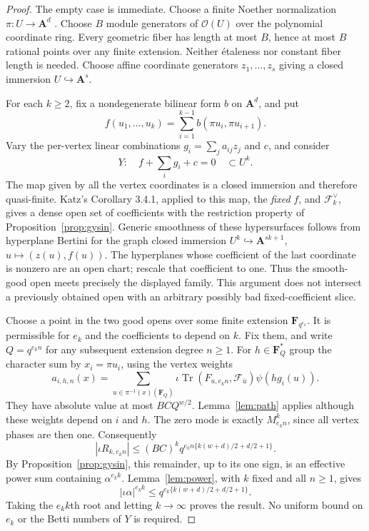 \documentclass[11pt,a4paper]{article}
\theoremstyle{remark}
\begin{document}
\begin{proof}
The empty case is immediate.  Choose a finite Noether normalization
$\pi:U\to\mathbf A^d$ \cite[Lemma 10.115.4, Tag 00OY]{StacksNN}.
Choose $B$ module generators of $\mathcal O(U)$ over the polynomial
coordinate ring.  Every geometric fiber has length at most $B$, hence
at most $B$ rational points over any finite extension.  Neither
\'etaleness nor constant fiber length is needed.
Choose affine coordinate generators $z_1,\ldots,z_s$ giving a closed
immersion $U\hookrightarrow\mathbf A^s$.

For each $k\ge2$, fix a nondegenerate bilinear form $b$ on
$\mathbf A^d$, and put
\[
 f(u_1,\ldots,u_k)=\sum_{i=1}^{k-1}b(\pi u_i,\pi u_{i+1}).
\]
Vary the per-vertex linear combinations $g_i=\sum_j a_{ij}z_j$ and $c$,
and consider
\begin{equation}\label{eq:pathsection}
 Y:\quad f+\sum_i g_i+c=0\quad\subset U^k.
\end{equation}
The map given by all the vertex coordinates is a closed immersion and
therefore quasi-finite.  Katz's Corollary 3.4.1, applied to this map,
the \emph{fixed} $f$, and $\mathcal F_k^\vee$, gives a dense open set of
coefficients with the restriction property of Proposition~\ref{prop:gysin}.
Generic smoothness of these hypersurfaces follows from hyperplane
Bertini for the graph closed immersion
$U^k\hookrightarrow\mathbf A^{sk+1}$, $u\mapsto(z(u),f(u))$.
The hyperplanes whose coefficient of the last coordinate is nonzero are
an open chart; rescale that coefficient to one.  Thus the smooth-good
open meets precisely the displayed family.  This argument does not
intersect a previously obtained open with an arbitrary possibly bad
fixed-coefficient slice.

Choose a point in the two good opens over some finite extension
$\mathbf F_{q^{e_k}}$.  It is permissible for $e_k$ and the coefficients
to depend on $k$.  Fix them, and write $Q=q^{e_kn}$ for any subsequent
extension degree $n\ge1$.  For $h\in\mathbf F_Q^*$ group the character
sum by $x_i=\pi u_i$, using the vertex weights
\[
 a_{i,h,n}(x)=\sum_{u\in\pi^{-1}(x)(\mathbf F_Q)}
       \iota\operatorname{Tr}(F_{u,e_kn},\mathcal F_{\bar u})
                         \psi(hg_i(u)).
\]
They have absolute value at most $BC Q^{w/2}$.  Lemma~\ref{lem:path}
applies although these weights depend on $i$ and $h$.  The zero mode
is exactly $M_{e_kn}^k$, since all vertex phases are then one.
Consequently
\begin{equation}\label{eq:parsevalbound}
 |\iota R_{k,e_kn}|\le(BC)^k
       q^{e_kn\{k(w+d)/2+d/2+1\}}.
\end{equation}
By Proposition~\ref{prop:gysin}, this remainder, up to its one sign,
is an effective power sum containing $\alpha^{e_kk}$.
Lemma~\ref{lem:power}, with $k$ fixed and all $n\ge1$, gives
\[
 |\iota\alpha|^{e_kk}
       \le q^{e_k\{k(w+d)/2+d/2+1\}}.
\]
Taking the $e_kk$th root and letting $k\to\infty$ proves the result.
No uniform bound on $e_k$ or the Betti numbers of $Y$ is required.
\end{proof}
\end{document}
